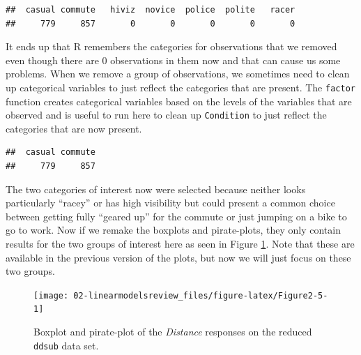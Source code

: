 \documentclass[
]{book}
\newenvironment{Shaded}{\begin{snugshade}}{\end{snugshade}}
\newcommand{\AttributeTok}[1]{\textcolor[rgb]{0.77,0.63,0.00}{#1}}
\newcommand{\FunctionTok}[1]{\textcolor[rgb]{0.00,0.00,0.00}{#1}}
\newcommand{\NormalTok}[1]{#1}
\newcommand{\OtherTok}[1]{\textcolor[rgb]{0.56,0.35,0.01}{#1}}
\newcommand{\SpecialCharTok}[1]{\textcolor[rgb]{0.00,0.00,0.00}{#1}}
\begin{document}
\begin{verbatim}
##  casual commute   hiviz  novice  police  polite   racer 
##     779     857       0       0       0       0       0
\end{verbatim}

It ends up that R remembers the categories for observations that we removed even though there are
0 observations in them now and that can cause us some problems. When we remove a
group of observations, we sometimes need to clean up categorical variables to
just reflect the categories that are present. The \texttt{factor}
function
creates categorical variables based on the levels of the variables that are
observed and is useful to run here to clean up \texttt{Condition} to just reflect the categories that are now present.

\begin{Shaded}
\end{Shaded}

\begin{verbatim}
##  casual commute 
##     779     857
\end{verbatim}

\indent The two categories of interest now were selected because neither looks particularly ``racey'' or has high visibility but could present a common choice between getting fully ``geared up'' for the commute or just jumping on a bike to go to work. Now if we remake the boxplots and pirate-plots, they only contain results for
the two groups of interest here as seen in Figure \ref{fig:Figure2-5}. Note that these are available in the previous version of the plots, but now we will just focus on these two groups.



\begin{figure}[ht!]

{\centering \texttt{[image: 02-linearmodelsreview\_files/figure-latex/Figure2-5-1]} 

}

\caption{Boxplot and pirate-plot of the \emph{Distance} responses on the reduced \texttt{ddsub} data set.}\label{fig:Figure2-5}
\end{figure}
\end{document}
